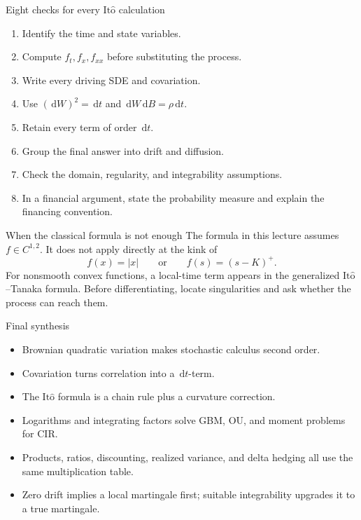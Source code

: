 \documentclass[10pt]{article}
\newcommand{\1}{\mathbf 1}
\newcommand{\dd}{\,\mathrm d}
\newcommand{\Ito}{\mathrm{It\hat{o}}}
\theoremstyle{definition}
\begin{document}
\begin{keyidea}{Eight checks for every \(\Ito\) calculation}
\begin{enumerate}
  \item Identify the time and state variables.
  \item Compute \(f_t,f_x,f_{xx}\) before substituting the process.
  \item Write every driving SDE and covariation.
  \item Use \((\dd W)^2=\dd t\) and
        \(\dd W\dd B=\rho\dd t\).
  \item Retain every term of order \(\dd t\).
  \item Group the final answer into drift and diffusion.
  \item Check the domain, regularity, and integrability assumptions.
  \item In a financial argument, state the probability measure and explain
        the financing convention.
\end{enumerate}
\end{keyidea}

\begin{warningbox}{When the classical formula is not enough}
The formula in this lecture assumes \(f\in C^{1,2}\). It does not apply
directly at the kink of
\[
f(x)=|x|
\qquad\text{or}\qquad
f(s)=(s-K)^+.
\]
For nonsmooth convex functions, a local-time term appears in the generalized
\(\Ito\)--Tanaka formula. Before differentiating, locate singularities and
ask whether the process can reach them.
\end{warningbox}

\begin{keyidea}{Final synthesis}
\begin{itemize}
  \item Brownian quadratic variation makes stochastic calculus second order.
  \item Covariation turns correlation into a \(\dd t\)-term.
  \item The \(\Ito\) formula is a chain rule plus a curvature correction.
  \item Logarithms and integrating factors solve GBM, OU, and moment problems
        for CIR.
  \item Products, ratios, discounting, realized variance, and delta hedging
        all use the same multiplication table.
  \item Zero drift implies a local martingale first; suitable integrability
        upgrades it to a true martingale.
\end{itemize}
\end{keyidea}
\end{document}
